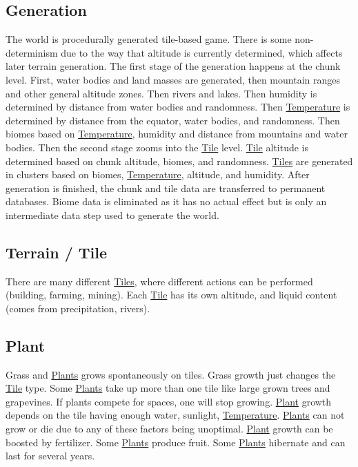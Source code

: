 \documentclass[11pt]{article}
\begin{document}
\subsection{Generation}
\label{sec:org2553fae}
The world is procedurally generated tile-based game. There is some non-determinism due to the way that altitude is currently determined, which affects later terrain generation. The first stage of the generation happens at the chunk level. First, water bodies and land masses are generated, then mountain ranges and other general altitude zones. Then rivers and lakes. Then humidity is determined by distance from water bodies and randomness. Then \hyperref[org1131659]{Temperature} is determined by distance from the equator, water bodies, and randomness. Then biomes based on \hyperref[org1131659]{Temperature}, humidity and distance from mountains and water bodies. Then the second stage zooms into the \hyperref[org938ee1c]{Tile} level. \hyperref[org938ee1c]{Tile} altitude is determined based on chunk altitude, biomes, and randomness. \hyperref[org5189a7f]{Tiles} are generated in clusters based on biomes, \hyperref[org1131659]{Temperature}, altitude, and humidity. After generation is finished, the chunk and tile data are transferred to permanent databases. Biome data is eliminated as it has no actual effect but is only an intermediate data step used to generate the world.\\
\subsection{Terrain / Tile\label{org938ee1c}\label{org5189a7f}}
\label{sec:org50c670f}
There are many different \hyperref[org5189a7f]{Tiles}, where different actions can be performed (building, farming, mining). Each \hyperref[org938ee1c]{Tile} has its own altitude, and liquid content (comes from precipitation, rivers).\\
\subsection{Plant \label{org38a7ff2} \label{org6e70fa0}}
\label{sec:orgfbe1e46}
Grass and \hyperref[org6e70fa0]{Plants} grows spontaneously on tiles. Grass growth just changes the \hyperref[org938ee1c]{Tile} type. Some \hyperref[org6e70fa0]{Plants} take up more than one tile like large grown trees and grapevines. If plants compete for spaces, one will stop growing. \hyperref[org38a7ff2]{Plant} growth depends on the tile having enough water, sunlight, \hyperref[org1131659]{Temperature}. \hyperref[org6e70fa0]{Plants} can not grow or die due to any of these factors being unoptimal. \hyperref[org38a7ff2]{Plant} growth can be boosted by fertilizer. Some \hyperref[org6e70fa0]{Plants} produce fruit. Some \hyperref[org6e70fa0]{Plants} hibernate and can last for several years.\\
\end{document}
